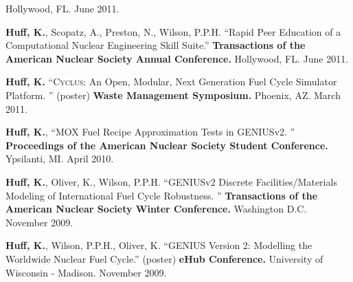 \documentclass[margin,line]{resume}
\newcommand{\Cyclus}{\textsc{Cyclus}\xspace}%
\begin{document}
\begin{resume}
\begin{bibenum}
        Hollywood, FL. June 2011.
      \item \textbf{Huff, K.}, Scopatz, A., Preston, N., Wilson, P.P.H. ``Rapid Peer Education of a Computational Nuclear Engineering Skill Suite.''
         \textbf{Transactions of the American Nuclear Society Annual Conference.}
        Hollywood, FL. June 2011.
      \item \textbf{Huff, K.} ``\Cyclus: An Open, Modular, Next Generation Fuel Cycle Simulator Platform. ''
        (poster)  \textbf{Waste Management Symposium.} Phoenix, AZ. March
        2011.
      \item \textbf{Huff, K.}, ``MOX Fuel Recipe Approximation Tests in GENIUSv2. ''
         \textbf{Proceedings of the American Nuclear Society Student Conference.}
        Ypsilanti, MI. April 2010.
      \item \textbf{Huff, K.}, Oliver, K., Wilson, P.P.H. ``GENIUSv2 Discrete Facilities/Materials Modeling of International
        Fuel Cycle Robustness. ''
         \textbf{Transactions of the American Nuclear Society Winter Conference.}
        Washington D.C. November 2009.
      \item \textbf{Huff, K.}, Wilson, P.P.H., Oliver, K. ``GENIUS Version 2: Modelling the Worldwide Nuclear Fuel Cycle.''
        (poster)  \textbf{eHub Conference.} University of Wisconsin -
        Madison. November 2009.
    \end{bibenum}


\end{resume}
\end{document}
